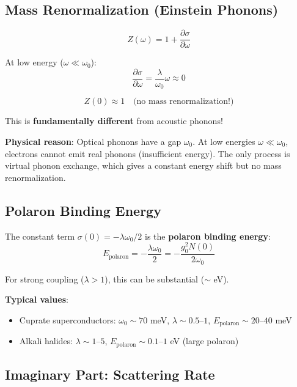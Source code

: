 \documentclass[12pt]{article}
\begin{document}
\subsection{Mass Renormalization (Einstein Phonons)}

\begin{equation}
Z(\omega) = 1 + \frac{\partial \sigma}{\partial \omega}
\end{equation}

At low energy ($\omega \ll \omega_0$):
\begin{equation}
\frac{\partial \sigma}{\partial \omega} = \frac{\lambda}{\omega_0} \omega \approx 0
\end{equation}

\begin{equation}
\boxed{
Z(0) \approx 1 \quad \text{(no mass renormalization!)}
}
\end{equation}

This is \textbf{fundamentally different} from acoustic phonons!

\textbf{Physical reason}: Optical phonons have a gap $\omega_0$. At low energies $\omega \ll \omega_0$, electrons cannot emit real phonons (insufficient energy). The only process is virtual phonon exchange, which gives a constant energy shift but no mass renormalization.

\subsection{Polaron Binding Energy}

The constant term $\sigma(0) = -\lambda\omega_0/2$ is the \textbf{polaron binding energy}:
\begin{equation}
\boxed{
E_{\text{polaron}} = -\frac{\lambda \omega_0}{2} = -\frac{g_0^2 N(0)}{2\omega_0}
}
\end{equation}

For strong coupling ($\lambda > 1$), this can be substantial ($\sim$ eV).

\textbf{Typical values}:
\begin{itemize}
\item Cuprate superconductors: $\omega_0 \sim 70$ meV, $\lambda \sim 0.5\text{--}1$, $E_{\text{polaron}} \sim 20\text{--}40$ meV
\item Alkali halides: $\lambda \sim 1\text{--}5$, $E_{\text{polaron}} \sim 0.1\text{--}1$ eV (large polaron)
\end{itemize}

\subsection{Imaginary Part: Scattering Rate}
\end{document}
